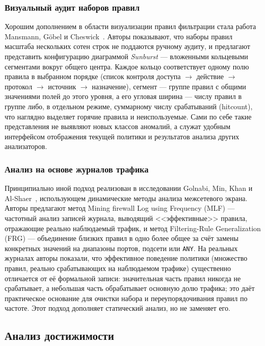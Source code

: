 \subsubsection{Визуальный аудит наборов правил}
\label{sec:Section2:visual}

Хорошим дополнением в области визуализации правил фильтрации стала работа Mansmann, Göbel и Cheswick~\cite{mansmann2012visual}. Авторы показывают, что наборы правил масштаба нескольких сотен строк не поддаются ручному аудиту, и предлагают представить конфигурацию диаграммой \emph{Sunburst} --- вложенными кольцевыми сегментами вокруг общего центра. Каждое кольцо соответствует одному полю правила в выбранном порядке (список контроля доступа $\to$ действие $\to$ протокол $\to$ источник $\to$ назначение), сегмент --- группе правил с общими значениями полей до этого уровня, а его угловая ширина --- числу правил в группе либо, в отдельном режиме, суммарному числу срабатываний (hitcount), что наглядно выделяет горячие правила и неиспользуемые. Сами по себе такие представления не выявляют новых классов аномалий, а служат удобным интерфейсом отображения текущей политики и результатов анализа других анализаторов.

\subsubsection{Анализ на основе журналов трафика}
\label{sec:Section2:logs}

Принципиально иной подход реализован в исследовании Golnabi, Min, Khan и Al-Shaer~\cite{golnabi2006analysis}, использующем динамические методы анализа межсетевого экрана. Авторы предлагают метод Mining firewall Log using Frequency (MLF) --- частотный анализ записей журнала, выводящий <<эффективные>> правила, отражающие реально наблюдаемый трафик, и метод Filtering-Rule Generalization (FRG) --- объединение близких правил в одно более общее за счёт замены конкретных значений на диапазоны портов, подсети или \texttt{ANY}. На реальных журналах авторы показали, что эффективное поведение политики (множество правил, реально срабатывающих на наблюдаемом трафике) существенно отличается от её формальной записи: значительная часть правил никогда не срабатывает, а небольшая часть обрабатывает основную долю трафика; это даёт практическое основание для очистки набора и переупорядочивания правил по частоте. Этот подход дополняет статический анализ, но не заменяет его.

\subsection{Анализ достижимости}
\label{sec:Section2:reachability}

